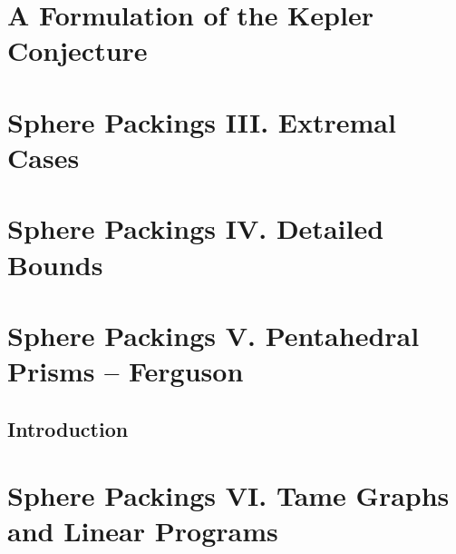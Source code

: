 \documentclass[onecolumn]{newsiambook}
\def\shortversion#1{#1}
\def\longversion#1{}
\def\shortversion#1{}
\def\longversion#1{#1}
\begin{document}

\longversion{
    \part{A Formulation of the Kepler Conjecture}
    
    }
    \label{part:form}
    


\longversion{
    \part{Sphere Packings III. Extremal Cases}
    \label{part:iii}
    
    
    
    }
\shortversion{}


\longversion{
    \part{Sphere Packings IV. Detailed Bounds}
    \label{part:bounds}
    
    
    }


\longversion{
    \part{Sphere Packings V. Pentahedral Prisms -- Ferguson}
    \label{part:ferguson}
    \chapter*{Introduction}
    
    
    }


\longversion{
    \part{Sphere Packings VI. Tame Graphs and Linear Programs}
    \label{part:tame}
    
    
    
    
    }
\end{document}
